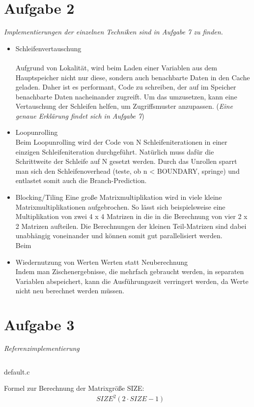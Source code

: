 \documentclass[a4paper]{article}
\begin{document}
\section*{Aufgabe 2}
\textit{Implementierungen der einzelnen Techniken sind in Aufgabe 7 zu finden.}
\begin{itemize} 
\item Schleifenvertauschung\\
\\
Aufgrund von Lokalität, wird beim Laden einer Variablen aus dem Hauptspeicher nicht nur diese, sondern auch benachbarte Daten in den Cache geladen. Daher ist es performant, Code zu schreiben, der auf im Speicher benachbarte Daten nacheinander zugreift. Um das umzusetzen, kann eine Vertauschung der Schleifen helfen, um Zugriffsmuster anzupassen. (\textit{Eine genaue Erklärung findet sich in Aufgabe 7})
\item Loopunrolling
\\
Beim Loopunrolling wird der Code von N Schleifeniterationen in einer einzigen Schleifeniteration durchgeführt. Natürlich muss dafür die Schrittweite der Schleife auf N gesetzt werden. Durch das Unrollen sparrt man sich den Schleifenoverhead (teste, ob n < BOUNDARY, springe) und entlastet somit auch die Branch-Prediction.
\item Blocking/Tiling
Eine große Matrixmultiplikation wird in viele kleine Matrixmultiplikationen aufgebrochen. So lässt sich beispielsweise eine Multiplikation von zwei 4 x 4 Matrizen in die in die Berechnung von vier 2 x 2 Matrizen aufteilen. Die Berechnungen der kleinen Teil-Matrizen sind dabei unabhängig voneinander und können somit gut parallelisiert werden.
\\
Beim 
\item Wiedernutzung von Werten Werten statt Neuberechnung
\\
Indem man Zischenergebnisse, die mehrfach gebraucht werden, in separaten Variablen abspeichert, kann die Ausführungszeit verringert werden, da Werte nicht neu berechnet werden müssen.

\end{itemize}

\section*{Aufgabe 3}
\textit{Referenzimplementierung}
\begin{listing}[H]
\inputminted[firstline=3]{c}{default.c}
\caption{default.c}
\end{listing}
Formel zur Berechnung der Matrixgröße SIZE:
\begin{align*}
    & SIZE^{2} (2\cdot SIZE - 1)
\end{align*}
\end{document}
